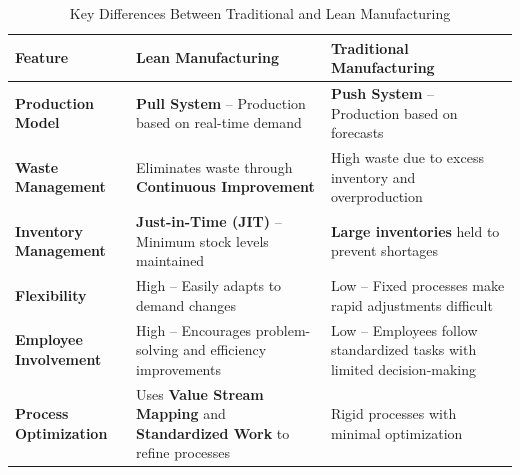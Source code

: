 \begin{table}[h!]
\centering
\caption{Key Differences Between Traditional and Lean Manufacturing}
\begin{tabular}{|p{3cm}|p{6cm}|p{6cm}|}
\hline
\textbf{Feature} & \textbf{Lean Manufacturing} & \textbf{Traditional Manufacturing} \\ \hline

\textbf{Production Model} & 
\textbf{Pull System} – Production based on real-time demand & 
\textbf{Push System} – Production based on forecasts \\ \hline

\textbf{Waste Management} & 
Eliminates waste through \textbf{Continuous Improvement} & 
High waste due to excess inventory and overproduction \\ \hline

\textbf{Inventory Management} & 
\textbf{Just-in-Time (JIT)} – Minimum stock levels maintained & 
\textbf{Large inventories} held to prevent shortages \\ \hline

\textbf{Flexibility} & 
High – Easily adapts to demand changes & 
Low – Fixed processes make rapid adjustments difficult \\ \hline

\textbf{Employee Involvement} & 
High – Encourages problem-solving and efficiency improvements & 
Low – Employees follow standardized tasks with limited decision-making \\ \hline

\textbf{Process Optimization} & 
Uses \textbf{Value Stream Mapping} and \textbf{Standardized Work} to refine processes & 
Rigid processes with minimal optimization \\ \hline

\end{tabular}
\end{table}
